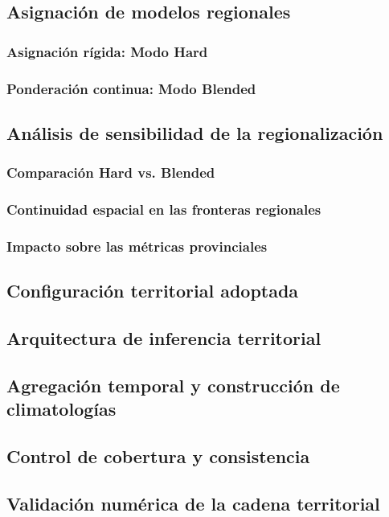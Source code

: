 \documentclass[11pt,a4paper]{article}
\begin{document}
\subsection{Asignación de modelos regionales}
\subsubsection{Asignación rígida: Modo Hard}
\subsubsection{Ponderación continua: Modo Blended}

\subsection{Análisis de sensibilidad de la regionalización}
\subsubsection{Comparación Hard vs. Blended}
\subsubsection{Continuidad espacial en las fronteras regionales}
\subsubsection{Impacto sobre las métricas provinciales}

\subsection{Configuración territorial adoptada}
\subsection{Arquitectura de inferencia territorial}
\subsection{Agregación temporal y construcción de climatologías}
\subsection{Control de cobertura y consistencia}
\subsection{Validación numérica de la cadena territorial}
\end{document}
